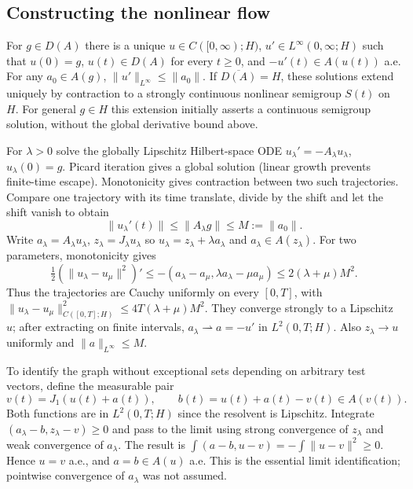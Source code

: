 \subsection{Constructing the nonlinear flow}
\Needspace{50mm}
\begin{theorem}
For $g\in D(A)$ there is a unique
$u\in C([0,\infty);H)$, $u'\in L^\infty(0,\infty;H)$ such that
$u(0)=g$, $u(t)\in D(A)$ for every $t\geq0$, and
$-u'(t)\in A(u(t))$ a.e. For any $a_0\in A(g)$,
$\|u'\|_{L^\infty}\leq\|a_0\|$.
If $\overline{D(A)}=H$, these solutions extend uniquely by contraction
to a strongly continuous nonlinear semigroup $S(t)$ on $H$.
For general $g\in H$ this extension initially asserts a continuous
semigroup solution, without the global derivative bound above.
\end{theorem}
\begin{expandedproof}
For $\lambda>0$ solve the globally Lipschitz Hilbert-space ODE
$u_\lambda'=-A_\lambda u_\lambda$, $u_\lambda(0)=g$.
Picard iteration gives a global solution (linear growth prevents finite-time
escape). Monotonicity gives contraction between two such trajectories.
Compare one trajectory with its time translate, divide by the shift and
let the shift vanish to obtain
\[
 \|u_\lambda'(t)\|\leq\|A_\lambda g\|\leq M:=\|a_0\|.
\]
Write $a_\lambda=A_\lambda u_\lambda$, $z_\lambda=J_\lambda u_\lambda$
so $u_\lambda=z_\lambda+\lambda a_\lambda$ and
$a_\lambda\in A(z_\lambda)$. For two parameters, monotonicity gives
\[
 \tfrac12(\|u_\lambda-u_\mu\|^2)'
 \leq- (a_\lambda-a_\mu,\lambda a_\lambda-\mu a_\mu)
 \leq2(\lambda+\mu)M^2.
\]
Thus the trajectories are Cauchy uniformly on every $[0,T]$, with
$\|u_\lambda-u_\mu\|_{C([0,T];H)}^2\leq4T(\lambda+\mu)M^2$.
They converge strongly to a Lipschitz $u$; after extracting on finite
intervals, $a_\lambda\rightharpoonup a=-u'$ in $L^2(0,T;H)$.
Also $z_\lambda\to u$ uniformly and $\|a\|_{L^\infty}\leq M$.

To identify the graph without exceptional sets depending on arbitrary
test vectors, define the measurable pair
\[
 v(t)=J_1(u(t)+a(t)),\qquad b(t)=u(t)+a(t)-v(t)\in A(v(t)).
\]
Both functions are in $L^2(0,T;H)$ since the resolvent is Lipschitz.
Integrate $(a_\lambda-b,z_\lambda-v)\geq0$ and pass to the limit using
strong convergence of $z_\lambda$ and weak convergence of $a_\lambda$.
The result is
$\int(a-b,u-v)=-\int\|u-v\|^2\geq0$.
Hence $u=v$ a.e., and $a=b\in A(u)$ a.e. This is the essential limit
identification; pointwise convergence of $a_\lambda$ was not assumed.


\end{expandedproof}
